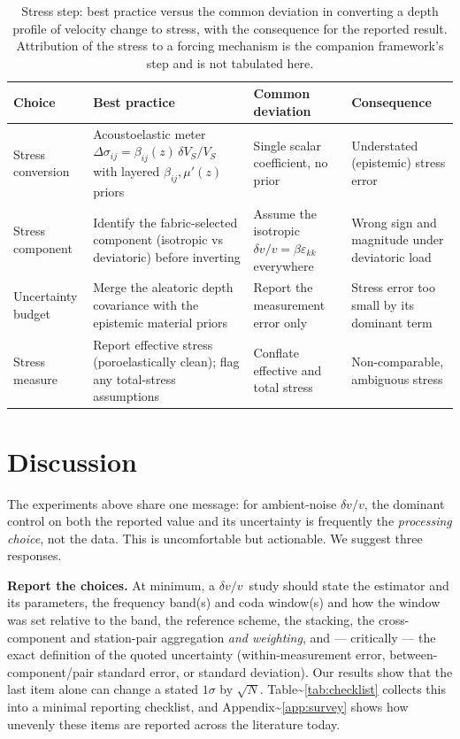 \documentclass[
  11pt,
  letterpaper,
]{article}
\providecommand{\dvv}{\ensuremath{\delta v/v}}
\begin{document}
\begin{table}[htbp]
\footnotesize
\caption{Stress step: best practice versus the common deviation in converting a
depth profile of velocity change to stress, with the consequence for the reported
result. Attribution of the stress to a forcing mechanism is the companion
framework's step and is not tabulated here.}
\label{tab:bp-stress}
\begin{tabularx}{\textwidth}{@{}>{\raggedright\arraybackslash}p{2.6cm} L L L@{}}
\toprule
\textbf{Choice} & \textbf{Best practice} & \textbf{Common deviation} &
\textbf{Consequence} \\
\midrule
Stress conversion & Acoustoelastic meter $\Delta\sigma_{ij}=\beta_{ij}(z)\,\delta V_S/V_S$
with layered $\beta_{ij},\mu'(z)$ priors & Single scalar coefficient, no prior &
Understated (epistemic) stress error \\ \hline
Stress component & Identify the fabric-selected component (isotropic vs deviatoric)
before inverting & Assume the isotropic $\delta v/v=\beta\varepsilon_{kk}$
everywhere & Wrong sign and magnitude under deviatoric load \\ \hline
Uncertainty budget & Merge the aleatoric depth covariance with the epistemic
material priors & Report the measurement error only & Stress error too small by
its dominant term \\ \hline
Stress measure & Report effective stress (poroelastically clean); flag any
total-stress assumptions & Conflate effective and total stress &
Non-comparable, ambiguous stress \\
\bottomrule
\end{tabularx}
\end{table}

\section{Discussion}\label{sec:discussion}

The experiments above share one message: for ambient-noise \dvv, the
dominant control on both the reported value and its uncertainty is
frequently the \emph{processing choice}, not the data. This is
uncomfortable but actionable. We suggest three responses.

\textbf{Report the choices.} At minimum, a \dvv~study should state the
estimator and its parameters, the frequency band(s) and coda window(s)
and how the window was set relative to the band, the reference scheme,
the stacking, the cross-component and station-pair aggregation \emph{and
weighting}, and --- critically --- the exact definition of the quoted
uncertainty (within-measurement error, between-component/pair standard
error, or standard deviation). Our results show that the last item alone
can change a stated \(1\sigma\) by \(\sqrt{N}\).
Table\textasciitilde{}\ref{tab:checklist} collects this into a minimal
reporting checklist, and Appendix\textasciitilde{}\ref{app:survey} shows
how unevenly these items are reported across the literature today.
\end{document}
